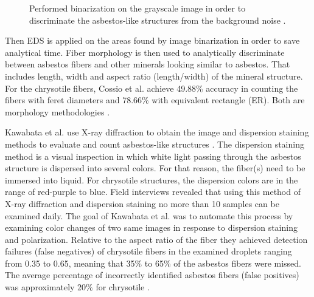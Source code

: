 \begin{figure}[h]
\centering
\caption{Performed binarization on the grayscale image in order to discriminate the asbestos-like structures from the background noise \cite{cossio2018innovative}. }
\label{fig:binarization}
\end{figure}

Then EDS is applied on the areas found by image binarization in order to save analytical time. Fiber morphology is then used to analytically discriminate between asbestos fibers and other minerals looking similar to asbestos. That includes length, width and aspect ratio (length/width) of the mineral structure. For the chrysotile fibers, Cossio et al. achieve 49.88\% accuracy in counting the fibers with feret diameters and 78.66\% with equivalent rectangle (ER). Both are morphology methodologies \cite{cossio2018innovative}.

Kawabata et al. use X-ray diffraction to obtain the image and dispersion staining methods to evaluate and count asbestos-like structures \cite{kawabata2009asbestos}. The dispersion staining method is a visual inspection in which white light passing through the asbestos structure is dispersed into several colors. For that reason, the fiber(s) need to be immersed into liquid. For chrysotile structures, the dispersion colors are in the range of red-purple to blue. Field interviews revealed that using this method of X-ray diffraction and dispersion staining no more than 10 samples can be examined daily. The goal of Kawabata et al. was to automate this process by examining color changes of two same images in response to dispersion staining and polarization. Relative to the aspect ratio of the fiber they achieved detection failures (false negatives) of chrysotile fibers in the examined droplets ranging from 0.35 to 0.65, meaning that 35\% to 65\% of the asbestos fibers were missed. The average percentage of incorrectly identified asbestos fibers (false positives) was approximately 20\% for chrysotile \cite{kawabata2009asbestos}. 

